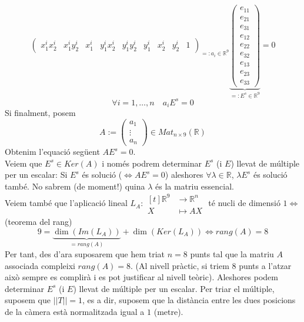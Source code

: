\documentclass[a4paper,12pt]{article}
\begin{document}
\begin{enumerate}
\begin{displaymath}
{\begin{pmatrix}
							x_1^i x_2^i & x_1^i y_2^i & x_1^i & y_1^i x_2^i & y_1^i y_2^i & y_1^i & x_2^i & y_2^i & 1
			\end{pmatrix}}_{=: a_i \in \mathbb{R}^9}
			\underbrace{\begin{pmatrix}
							e_{11}\\
							e_{21}\\
							e_{31}\\
							e_{12}\\
							e_{22}\\
							e_{32}\\
							e_{13}\\
							e_{23}\\
							e_{33}
			\end{pmatrix}}_{=: E^s \in \mathbb{R}^9} = 0
		\end{displaymath}
		\begin{displaymath}
			\forall i = 1, \dots, n\quad a_iE^s = 0
		\end{displaymath}
		Si finalment, posem
		\begin{displaymath}
			A := \begin{pmatrix}a_1\\ \vdots\\ a_n\end{pmatrix} \in Mat_{n\times9}(\mathbb{R})
		\end{displaymath}
		Obtenim l'equació següent $AE^s = 0$.\\
		Veiem que $E^s \in Ker(A)$ i només podrem determinar $E^s$ (i $E$) llevat de múltiple per un escalar:
		Si $E^s$ és solució ($\Leftrightarrow AE^s = 0$) aleshores $\forall \lambda \in \mathbb{R}$, $\lambda E^s$ és solució també. No sabrem (de moment!) quina $\lambda$ és la matriu essencial.\\
		Veiem també que l'aplicació lineal $L_A: \begin{aligned}[t]\mathbb{R}^9 &\to \mathbb{R}^n\\X &\mapsto AX\end{aligned}$ té nucli de dimensió $1 \iff$ (teorema del rang)
	 	\begin{displaymath}
				9 = \underbrace{\dim(Im(L_A))}_{= rang(A)} + \dim(Ker(L_A)) \iff rang(A) = 8
		\end{displaymath}
		Per tant, des d'ara suposarem que hem triat $n = 8$ punts tal que la matriu $A$ associada compleixi $rang(A) = 8$.
		(Al nivell pràctic, si triem $8$ punts a l'atzar això sempre es complirà i es pot justificar al nivell teòric).
		Aleshores podem determinar $E^s$ (i $E$) llevat de múltiple per un escalar. Per triar el múltiple, suposem que $||T|| = 1$, es a dir, suposem que la distància entre les dues posicions de la càmera està normalitzada igual a $1$ (metre).

\end{enumerate}
\end{document}
